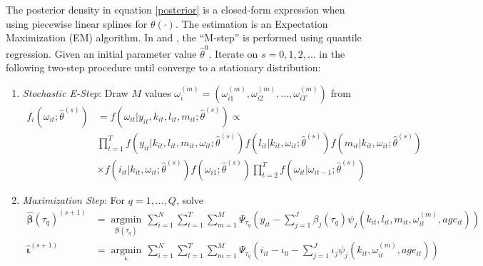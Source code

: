 \documentclass{article}
\begin{document}
The posterior density in equation \eqref{posterior} is a closed-form expression when using piecewise linear splines for $\theta(\cdot)$. The estimation is an Expectation Maximization (EM) algorithm. In \cite{Arellano2016} and \cite{Arellano2017}, the ``M-step'' is performed using quantile regression. Given an initial parameter value $\hat{\theta}^{0}$. Iterate on $s=0,1,2,\dots$ in the following two-step procedure until converge to a stationary distribution:

\begin{enumerate}
    \item \textit{Stochastic E-Step}: Draw $M$ values $\omega_{i}^{(m)}=(\omega_{i1}^{(m)}, \omega_{i2}^{(m)},\dots, \omega_{iT}^{(m)})$ from
        \begin{equation*}
        \begin{split}
            f_{i}(\omega_{it};\hat{\theta}^{(s)})&=f(\omega_{it}|y_{it}, k_{it}, l_{it}, m_{it}; \hat{\theta}^{(s)}) \propto\\
            &\prod_{t=1}^{T}f(y_{it}|k_{it}, l_{it}, m_{it}, \omega_{it};\hat{\theta}^{(s)})f(l_{it}|k_{it}, \omega_{it};\hat{\theta}^{(s)})f(m_{it}|k_{it}, \omega_{it};\hat{\theta}^{(s)}) \\
            &\times f(i_{it}|k_{it}, \omega_{it};\hat{\theta}^{(s)})f(\omega_{i1};\hat{\theta}^{(s)})\prod_{t=2}^{T}f(\omega_{it}|\omega_{it-1};\hat{\theta}^{(s)})
            \end{split}
        \end{equation*}
    \item \textit{Maximization Step}: For $q=1,\dots, Q$, solve
    \begin{equation*}
    \begin{split}
    \hat{\boldsymbol\beta}(\tau_{q})^{(s+1)}&=\underset{\boldsymbol\beta(\tau_{q})}{\operatorname{argmin}}\,\sum_{i=1}^{N}\sum_{t=1}^{T}\sum_{m=1}^{M}\Psi_{\tau_{q}}(y_{it}-\sum_{j=1}^{J}\beta_{j}(\tau_{q})\psi_{j}(k_{it}, l_{it}, m_{it}, \omega_{it}^{(m)}, age_{it}))\\
    \hat{\boldsymbol\iota}^{(s+1)}&=\underset{\boldsymbol\iota}{\operatorname{argmin}}\,\sum_{i=1}^{N}\sum_{t=1}^{T}\sum_{m=1}^{M}\Psi_{\tau_{q}}(i_{it}-\iota_{0}-\sum_{j=1}^{J}\iota_{j}\psi_{j}(k_{it}, \omega_{it}^{(m)}, age_{it}))\\
    \end{split}
    \end{equation*}
    

\end{enumerate}
\end{document}

